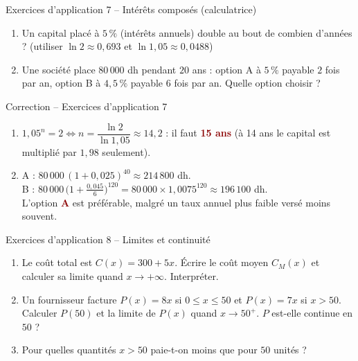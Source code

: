 \documentclass[aspectratio=169,11pt]{beamer}
\newcommand{\important}[1]{\textcolor{DarkRed}{\textbf{#1}}}
\begin{document}
\begin{frame}{Exercices d'application 7 -- Intérêts composés (calculatrice)}
	\begin{exercicebox}\small
		\begin{enumerate}
			\item Un capital placé à $5\,\%$ (intérêts annuels) double au bout de combien d'années ? (utiliser $\ln2\approx0{,}693$ et $\ln1{,}05\approx0{,}0488$)
			\item Une société place $80\,000$ dh pendant $20$ ans : option A à $5\,\%$ payable $2$ fois par an, option B à $4{,}5\,\%$ payable $6$ fois par an. Quelle option choisir ?
		\end{enumerate}
	\end{exercicebox}
\end{frame}

\begin{frame}{Correction -- Exercices d'application 7}
	\small
	\begin{enumerate}
		\item $1{,}05^n=2\iff n=\dfrac{\ln2}{\ln1{,}05}\approx14{,}2$ : il faut \important{15 ans} (à 14 ans le capital est multiplié par $1{,}98$ seulement).
		\item A : $80\,000\,(1+0{,}025)^{40}\approx214\,800$ dh.\\
		B : $80\,000\,\big(1+\tfrac{0{,}045}{6}\big)^{120}=80\,000\times1{,}0075^{120}\approx196\,100$ dh.\\
		L'option \important{A} est préférable, malgré un taux annuel plus faible versé moins souvent.
	\end{enumerate}
\end{frame}

\begin{frame}{Exercices d'application 8 -- Limites et continuité}
	\begin{exercicebox}\small
		\begin{enumerate}
			\item Le coût total est $C(x)=300+5x$. Écrire le coût moyen $C_M(x)$ et calculer sa limite quand $x\to+\infty$. Interpréter.
			\item Un fournisseur facture $P(x)=8x$ si $0\le x\le50$ et $P(x)=7x$ si $x>50$. Calculer $P(50)$ et la limite de $P(x)$ quand $x\to50^+$. $P$ est-elle continue en $50$ ?
			\item Pour quelles quantités $x>50$ paie-t-on moins que pour $50$ unités ?
		\end{enumerate}
	\end{exercicebox}
\end{frame}
\end{document}
